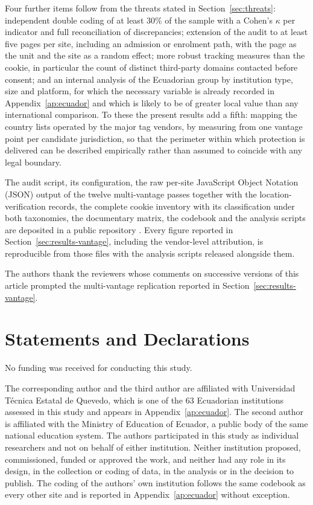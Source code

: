 \documentclass[pdflatex,sn-basic,Numbered,iicol]{sn-jnl}
\theoremstyle{thmstyleone}
\theoremstyle{thmstyletwo}
\theoremstyle{thmstylethree}
\begin{document}
Four further items follow from the threats stated in Section~\ref{sec:threats}: independent double coding of at least 30\% of the sample with a Cohen's $\kappa$ per indicator and full reconciliation of discrepancies; extension of the audit to at least five pages per site, including an admission or enrolment path, with the page as the unit and the site as a random effect; more robust tracking measures than the cookie, in particular the count of distinct third-party domains contacted before consent; and an internal analysis of the Ecuadorian group by institution type, size and platform, for which the necessary variable is already recorded in Appendix~\ref{ap:ecuador} and which is likely to be of greater local value than any international comparison. To these the present results add a fifth: mapping the country lists operated by the major tag vendors, by measuring from one vantage point per candidate jurisdiction, so that the perimeter within which protection is delivered can be described empirically rather than assumed to coincide with any legal boundary.

\backmatter

The audit script, its configuration, the raw per-site JavaScript Object Notation (JSON) output of the twelve multi-vantage passes together with the location-verification records, the complete cookie inventory with its classification under both taxonomies, the documentary matrix, the codebook and the analysis scripts are deposited in a public repository \citep{deposito2026}. Every figure reported in Section~\ref{sec:results-vantage}, including the vendor-level attribution, is reproducible from those files with the analysis scripts released alongside them.

The authors thank the reviewers whose comments on successive versions of this article prompted the multi-vantage replication reported in Section~\ref{sec:results-vantage}.

\section*{Statements and Declarations}

No funding was received for conducting this study.

The corresponding author and the third author are affiliated with Universidad T\'ecnica Estatal de Quevedo, which is one of the 63 Ecuadorian institutions assessed in this study and appears in Appendix~\ref{ap:ecuador}. The second author is affiliated with the Ministry of Education of Ecuador, a public body of the same national education system. The authors participated in this study as individual researchers and not on behalf of either institution. Neither institution proposed, commissioned, funded or approved the work, and neither had any role in its design, in the collection or coding of data, in the analysis or in the decision to publish. The coding of the authors' own institution follows the same codebook as every other site and is reported in Appendix~\ref{ap:ecuador} without exception.
\end{document}
